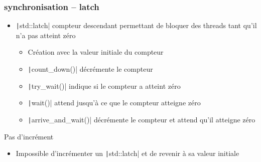 \documentclass[C++.tex]{subfiles}
\begin{document}
\begin{frame}[fragile]
	\frametitle{synchronisation -- latch}
	\begin{itemize}
		\item \texttt|std::latch| compteur descendant permettant de bloquer des threads tant qu'il n'a pas atteint zéro
		\begin{itemize}
			\item Création avec la valeur initiale du compteur
			\item \texttt|count_down()| décrémente le compteur
			\item \texttt|try_wait()| indique si le compteur a atteint zéro
			\item \texttt|wait()| attend jusqu'à ce que le compteur atteigne zéro
			\item \texttt|arrive_and_wait()| décrémente le compteur et attend qu'il atteigne zéro
		\end{itemize}
	\end{itemize}

	\begin{alertblock}{Pas d'incrément}
		\begin{itemize}
			\item Impossible d'incrémenter un \texttt|std::latch| et de revenir à sa valeur initiale
		\end{itemize}
	\end{alertblock}



\end{frame}
\end{document}
